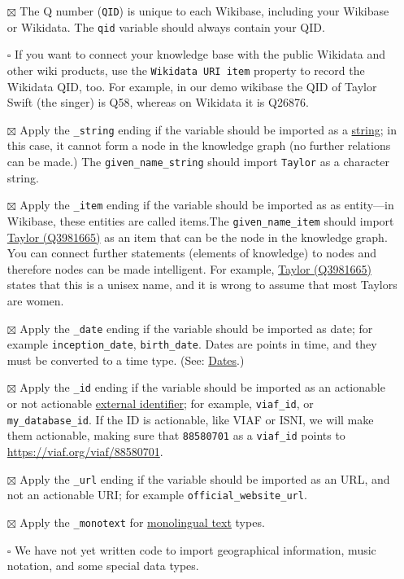 \documentclass[
  letterpaper,
  DIV=11,
  numbers=noendperiod]{scrreprt}
\begin{document}
\begin{itemize}
\item[$\boxtimes$]
  The Q number (\texttt{QID}) is unique to each Wikibase, including your
  Wikibase or Wikidata. The \texttt{qid} variable should always contain
  your QID.
\item[$\square$]
  If you want to connect your knowledge base with the public Wikidata
  and other wiki products, use the \texttt{Wikidata\ URI\ item} property
  to record the Wikidata QID, too. For example, in our demo wikibase the
  QID of Taylor Swift (the singer) is Q58, whereas on Wikidata it is
  Q26876.
\item[$\boxtimes$]
  Apply the \texttt{\_string} ending if the variable should be imported
  as a
  \href{https://www.wikidata.org/wiki/Special:MyLanguage/Help:Data_type\#string}{string};
  in this case, it cannot form a node in the knowledge graph (no further
  relations can be made.) The \texttt{given\_name\_string} should import
  \texttt{Taylor} as a character string.
\item[$\boxtimes$]
  Apply the \texttt{\_item} ending if the variable should be imported as
  as entity---in Wikibase, these entities are called items.The
  \texttt{given\_name\_item} should import
  \href{https://www.wikidata.org/wiki/Q3981665}{Taylor (Q3981665)} as an
  item that can be the node in the knowledge graph. You can connect
  further statements (elements of knowledge) to nodes and therefore
  nodes can be made intelligent. For example,
  \href{https://www.wikidata.org/wiki/Q3981665}{Taylor (Q3981665)}
  states that this is a unisex name, and it is wrong to assume that most
  Taylors are women.
\item[$\boxtimes$]
  Apply the \texttt{\_date} ending if the variable should be imported as
  date; for example \texttt{inception\_date}, \texttt{birth\_date}.
  Dates are points in time, and they must be converted to a time type.
  (See:
  \href{https://www.wikidata.org/wiki/Special:MyLanguage/Help:Dates}{Dates}.)
\item[$\boxtimes$]
  Apply the \texttt{\_id} ending if the variable should be imported as
  an actionable or not actionable
  \href{https://www.wikidata.org/wiki/Special:MyLanguage/Help:Data_type\#external-id}{external
  identifier}; for example, \texttt{viaf\_id}, or
  \texttt{my\_database\_id}. If the ID is actionable, like VIAF or ISNI,
  we will make them actionable, making sure that \texttt{88580701} as a
  \texttt{viaf\_id} points to \url{https://viaf.org/viaf/88580701}.
\item[$\boxtimes$]
  Apply the \texttt{\_url} ending if the variable should be imported as
  an URL, and not an actionable URI; for example
  \texttt{official\_website\_url}.
\item[$\boxtimes$]
  Apply the \texttt{\_monotext} for
  \href{https://www.wikidata.org/wiki/Special:MyLanguage/Help:Data_type\#monolingualtext}{monolingual
  text} types.
\item[$\square$]
  We have not yet written code to import geographical information, music
  notation, and some special data types.
\end{itemize}
\end{document}
